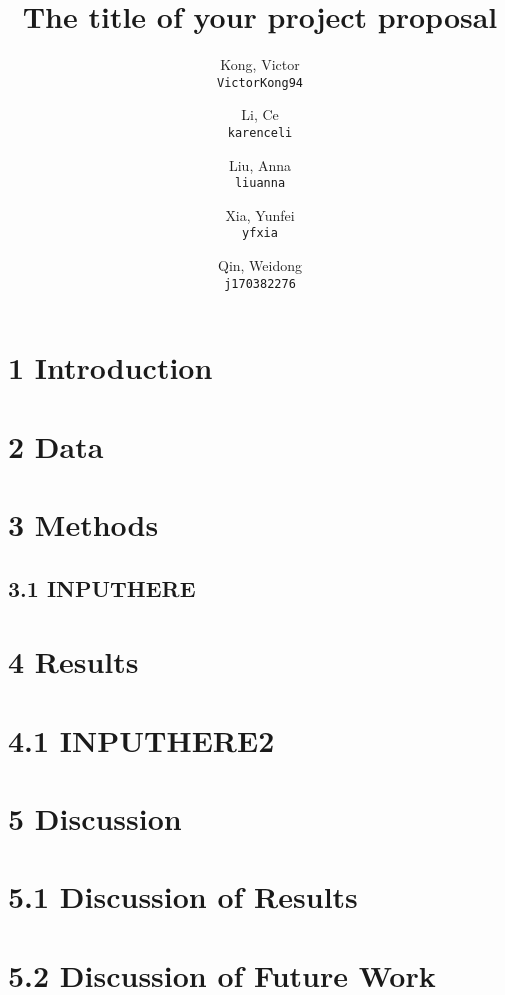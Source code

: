 \documentclass[11pt]{article}
\title{The title of your project proposal}
\author{
  Kong, Victor\\
  \texttt{VictorKong94}
  \and
  Li, Ce\\
  \texttt{karenceli}
  \and
  Liu, Anna\\
  \texttt{liuanna}
  \and
  Xia, Yunfei\\
  \texttt{yfxia}
  \and
  Qin, Weidong\\
  \texttt{j170382276}
}
\begin{document}
\maketitle

\abstract{}

\section{1 Introduction}
        

\section{2 Data}
        

\section{3 Methods}

    \subsection{3.1 INPUTHERE}
            

\section{4 Results}

    \section{4.1 INPUTHERE2}
            

\section{5 Discussion}

    \section{5.1 Discussion of Results}
            

    \section{5.2 Discussion of Future Work}
            


\end{document}
